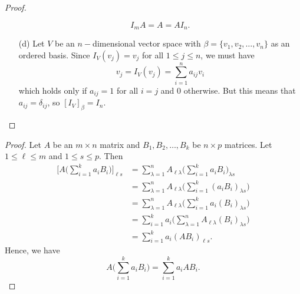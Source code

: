 \begin{proof}
\begin{enumerate}
    \[  {I}_{m} A = A = A {I}_{n}. \]
    \item[(d)] Let \( V  \) be an \( n- \)dimensional vector space with \( \beta = \{ {v}_{1}, {v}_{2}, \dots, {v}_{n} \}  \) as an ordered basis. Since \( {I}_{V}({v}_{j}) = {v}_{j }  \) for all \( 1 \leq j \leq n  \), we must have
        \[  {v}_{j} = {I}_{V}({v}_{j}) = \sum_{ i=1 }^{ n } {a}_{ij} {v}_{i}   \]
        which holds only if \(  {a}_{ij} = 1  \) for all \( i = j  \) and \( 0  \) otherwise. But this means that \( {a}_{ij} = {\delta}_{ij}  \), so \( [{I}_{V}]_{\beta}^{}  = {I}_{n} \).
        
\end{enumerate}
\end{proof}

\begin{proof}
Let \( A  \) be an \( m \times n  \) matrix and \( {B}_{1}, {B}_{2}, \dots, {B}_{k } \) be \( n \times p  \) matrices. Let \( 1 \leq \ell \leq m  \) and \( 1 \leq s  \leq p  \). Then
\begin{align*}
    \Big[ A \Big( \sum_{ i=1 }^{ k  } {a}_{i} {B}_{i} \Big) \Big]_{\ell s } &= \sum_{ \lambda = 1  }^{ n } {A}_{ \ell \lambda }  \Big( \sum_{ i=1 }^{ k  } {a}_{i} {B}_{i} \Big)_{\lambda s }  \\
                                                                        &= \sum_{ \lambda = 1  }^{ n  } {A}_{ \ell \lambda } \Big(  \sum_{ i=1  }^{  k  } {({a}_{i} {B}_{i})}_{\lambda s } \Big)  \\
                                                                        &=  \sum_{ \lambda = 1  }^{ n  } {A}_{ \ell \lambda } \Big( \sum_{ i=1 }^{ k  } {a}_{i} ({B}_{i})_{\lambda s } \Big) \\
                                                                        &= \sum_{ i=1  }^{ k  } {a}_{i} \Big( \sum_{ \lambda =1  }^{ n  } {A}_{ \ell \lambda } ({B}_{i})_{\lambda s } \Big) \tag{part (a) of Theorem 2.12}  \\
                                                                        &= \sum_{ i=1  }^{ k  } {a}_{i}  (A {B}_{i})_{\ell s } .
\end{align*}
Hence, we have
\[  A \Big( \sum_{ i=1 }^{ k  } {a}_{i} {B}_{i}  \Big) = \sum_{ i=1  }^{  k  } {a}_{i} {AB}_{i}.\]


\end{proof}
